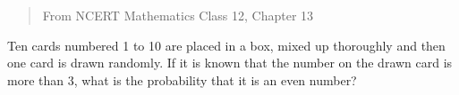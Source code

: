\documentclass[journal,12pt,twocolumn]{IEEEtran}
\begin{document}
% 

\maketitle
\newpage
\bigskip
\begin{abstract}
  From NCERT Mathematics Class 12, Chapter 13
\end{abstract}

%



\begin{problem}[Example 3]
  
  Ten cards numbered 1 to 10 are placed in a box, mixed up thoroughly and then one card is drawn randomly. If it is known that the number on the drawn card is more than 3, what is the probability that it is an even number?
\end{problem}
\end{document}
